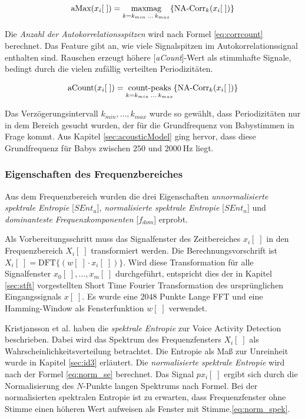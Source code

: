 \begin{equation}
\text{aMax}(x_i[\;]) = \operatorname*{max mag}_{k = k_{min} \: \ldots \: k_{max}}\{\text{NA-Corr}_k(x_i[\;])\}
\label{eq:corrpeak}
\end{equation}

Die \emph{Anzahl der Autokorrelationsspitzen} wird nach Formel \ref{eq:corrcount} berechnet. Das Feature gibt an, wie viele Signalspitzen im Autokorrelationssignal enthalten sind. Rauschen erzeugt höhere [\emph{aCount}]-Wert als stimmhafte Signale, bedingt durch die vielen zufällig verteilten Periodizitäten.\cite[S. 1 - 2]{vad_Lisboa}

\begin{equation}
\text{aCount}(x_i[\;]) = \operatorname*{count-peaks}_{k = k_{min} \: \ldots \: k_{max}}\{\text{NA-Corr}_k(x_i[\;])\}
\label{eq:corrcount}
\end{equation}

Das Verzögerungsintervall $k_{min} , \ldots , k_{max}$ wurde so gewählt, dass Periodizitäten nur in dem Bereich gesucht wurden, der für die Grundfrequenz von Babystimmen in Frage kommt. Aus Kapitel \ref{sec:acousticModel} ging hervor, dass diese Grundfrequenz für Babys zwischen $250$ und $\SI{2000}{\hertz}$ liegt.

\subsubsection{Eigenschaften des Frequenzbereiches}

Aus dem Frequenzbereich wurden die drei Eigenschaften \emph{unnormalisierte spektrale Entropie} [$SEnt_{u}$], \emph{normalisierte spektrale Entropie}  [$SEnt_{n}$] und \emph{dominanteste Frequenzkomponenten} [$f_{dom}$] erprobt.\cite{vad_Lisboa}

Als Vorbereitungsschritt muss das Signalfenster des Zeitbereiches $x_i[\;]$ in den Frequenzbereich $X_i[\;]$ transformiert werden. Die Berechnungsvorschrift ist $X_i[\;] = \text{DFT}\{(w[\;] \cdot x_i[\;])\}$. Wird diese Transformation für alle Signalfenster $x_0[\;], \ldots, x_m[\;]$ durchgeführt, entspricht dies der in Kapitel \ref{sec:stft} vorgestellten Short Time Fourier Transformation des ursprünglichen Eingangssignals $x[\;]$. Es wurde eine $2048$ Punkte Lange FFT und eine Hamming-Window als Fensterfunktion $w[\;]$ verwendet.

Kristjansson et al. \cite[S. 2]{vad_Lisboa} haben die \emph{spektrale Entropie} zur Voice Activity Detection beschrieben. Dabei wird das Spektrum des Frequenzfensters $X_i[\;]$ als Wahrscheinlichkeitsverteilung betrachtet. Die Entropie als Maß zur \glqq Unreinheit\grqq{} wurde in Kapitel \ref{sec:id3} erläutert. Die \emph{normalisierte spektrale Entropie} wird nach der Formel \ref{eq:norm_se} berechnet. Das Signal $px_i[\;]$ ergibt sich durch die Normalisierung des $N$-Punkte langen Spektrums nach Formel. Bei der normalisierten spektralen Entropie ist zu erwarten, dass Frequenzfenster ohne Stimme einen höheren Wert aufweisen als Fenster mit Stimme.\ref{eq:norm_spek}. 

